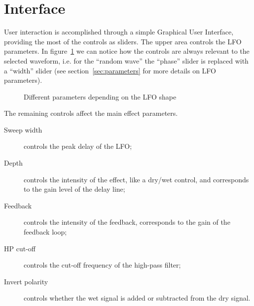 \section{Interface}\label{sec:gui}

User interaction is accomplished through a simple Graphical User Interface, providing the most of the controls as sliders.
The upper area controls the LFO parameters. In figure~\ref{fig:gui-lfo} we can notice how the controls are always relevant to the selected waveform, i.e. for the ``random wave'' the ``phase'' slider is replaced with a ``width'' slider (see section~\ref{sec:parameters} for more details on LFO parameters).

\begin{figure}[H]
	\centering
	\caption{Different parameters depending on the LFO shape}
	\label{fig:gui-lfo}
\end{figure}

The remaining controls affect the main effect parameters.

\begin{description}
	\item[Sweep width] controls the peak delay of the LFO;
	\item[Depth] controls the intensity of the effect, like a dry/wet control, and corresponds to the gain level of the delay line;
	\item[Feedback] controls the intensity of the feedback, corresponds to the gain of the feedback loop;
	\item[HP cut-off] controls the cut-off frequency of the high-pass filter;
	\item[Invert polarity] controls whether the wet signal is added or subtracted from the dry signal.
\end{description}


